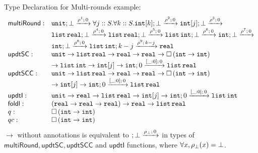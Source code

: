 Type Declaration for Multi-rounds example:
\[
\begin{array}{ll} 
  \mathsf{multiRound} 
  :
    &
    \tarr{\tunit}
    {
      \forall j:: S. \forall k:: S.
      \tarr{\tint[k]}
      {
        \tarr{\tint[j]}
        {
          \empty
        }{\bot}{\dmap^3}{0}
      }{\bot}{\dmap^2}{0}
    }{\bot}{\dmap^1}{0} \\
    &
    \tarr{\tlist{\treal}}
    {
      \tarr{\tlist{\treal}}
      {
        \tarr{\tlist{\tint}}
        {
          \tarr{\tint}
          {
            \empty
          }{\bot}{\dmap^7}{0}
        }{\bot}{\dmap^6}{0} 
      }{\bot}{\dmap^5}{0}
    }{\bot}{\dmap^4}{0}\\
    &
    \tarr{\tint}
    {
      \tarr{\tlist{\tint}}
      {
        \treal
      }{k - j}{\dmap^9}{k - j}
    }{\bot}{\dmap^8}{0}\\

  \mathsf{updtSC} : 
    & \tunit \to \tlist{\treal} \to \treal \to \treal \to \tbox{ \tint \to \tint } \\       
    & \to \tlist{\tint} \to \tint[j] \to \tarr{\tint}{\tlist{\treal}}{0}{[\_ : 0]}{0}\\
  \mathsf{updtSCC} : 
    & \tunit \to \tlist{\treal} \to \treal \to \treal \to \tbox{ \tint \to \tint } \\
    & \to \tint[j] \to \tarr{\tint}{\tlist{\treal}}{0}{[\_ : 0]}{0}\\
  \mathsf{updtI} : & \tunit \to \treal \to \tlist{\treal} \to \tint[j] \to \tarr{\tint}{\tlist{\tint}}{0}{[\_ : 0]}{0}\\
  \mathsf{foldl} : & (\treal \to \treal \to \treal) \to \treal \to \tlist{\treal}\\
  q :              & \tbox{\tint \to \tint}\\
  qc :             & \tbox{\tint \to \tint}\\
\end{array}
\]
$\to$ without annotations is equivalent to $; \bot \xrightarrow{\rho_{\bot}; \, 0}$ in types of $\mathsf{multiRound}, \mathsf{updtSC}, \mathsf{updtSCC}$ and $ \mathsf{updtI} $ functions, where $\forall x, \rho_{\bot}(x) = \bot$.



